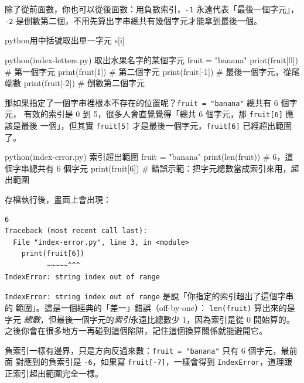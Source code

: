 除了從前面數，你也可以從後面數：用負數索引，\texttt{-1} 永遠代表「最後一個字元」，
\texttt{-2} 是倒數第二個，不用先算出字串總共有幾個字元才能拿到最後一個。

\begin{code}{python}{用中括號取出單一字元}
s[i]
\end{code}

\begin{example}{python}{(index-letters.py) 取出水果名字的某個字元}
fruit = "banana"
print(fruit[0])   # 第一個字元
print(fruit[1])   # 第二個字元
print(fruit[-1])  # 最後一個字元，從尾端數
print(fruit[-2])  # 倒數第二個字元
\end{example}



那如果指定了一個字串裡根本不存在的位置呢？\texttt{fruit = "banana"} 總共有 6 個字元，
有效的索引是 0 到 5，很多人會直覺覺得「總共 6 個字元，那 \texttt{fruit[6]} 應該是最後
一個」，但其實 \texttt{fruit[5]} 才是最後一個字元，\texttt{fruit[6]} 已經超出範圍了。

\begin{example}{python}{(index-error.py) 索引超出範圍}
fruit = "banana"
print(len(fruit))   # 6，這個字串總共有 6 個字元
print(fruit[6])      # 錯誤示範：把字元總數當成索引來用，超出範圍
\end{example}

存檔執行後，畫面上會出現：

\begin{verbatim}
6
Traceback (most recent call last):
  File "index-error.py", line 3, in <module>
    print(fruit[6])
          ~~~~~^^^
IndexError: string index out of range
\end{verbatim}

\texttt{IndexError: string index out of range} 是說「你指定的索引超出了這個字串的
範圍」。這是一個經典的「差一」錯誤（off-by-one）：
\texttt{len(fruit)} 算出來的是字元
\textit{總數}，但最後一個字元的\textit{索引}永遠比總數少 1，因為索引是從 0 開始算的。
之後你會在很多地方一再碰到這個陷阱，記住這個換算關係就能避開它。

負索引一樣有邊界，只是方向反過來數：\texttt{fruit = "banana"} 只有 6 個字元，最前面
對應到的負索引是 \texttt{-6}，如果寫 \texttt{fruit[-7]}，一樣會得到
\texttt{IndexError}，道理跟正索引超出範圍完全一樣。

